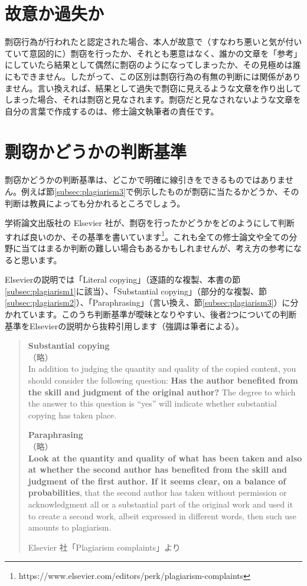 \section{故意か過失か}
剽窃行為が行われたと認定された場合、本人が故意で（すなわち悪いと気が付いていて意図的に）剽窃を行ったか、それとも悪意はなく、誰かの文章を「参考」にしていたら結果として偶然に剽窃のようになってしまったか、その見極めは誰にもできません。したがって、この区別は剽窃行為の有無の判断には関係がありません。言い換えれば、結果として過失で剽窃に見えるような文章を作り出してしまった場合、それは剽窃と見なされます。剽窃だと見なされないような文章を自分の言葉で作成するのは、修士論文執筆者の責任です。

\section{剽窃かどうかの判断基準}

剽窃かどうかの判断基準は、どこかで明確に線引きをできるものではありません。例えば節\ref{subsec:plagiarism3}で例示したものが剽窃に当たるかどうか、その判断は教員によっても分かれるところでしょう。

学術論文出版社の Elsevier 社が、剽窃を行ったかどうかをどのようにして判断すれば良いのか、その基準を書いています\footnote{https://www.elsevier.com/editors/perk/plagiarism-complaints}。これも全ての修士論文や全ての分野に当てはまるか判断の難しい場合もあるかもしれませんが、考え方の参考になると思います。

Elsevierの説明では「Literal copying」（逐語的な複製、本書の節\ref{subsec:plagiarism1}に該当）、「Substantial copying」（部分的な複製、節\ref{subsec:plagiarism2}）、「Paraphrasing」（言い換え、節\ref{subsec:plagiarism3}）に分かれています。このうち判断基準が曖昧となりやすい、後者2つについての判断基準をElsevierの説明から抜粋引用します（強調は筆者による）。

\begin{quote}
\textbf{Substantial copying}\\
（略）\\
In addition to judging the quantity and quality of the copied content, you should consider the following question: \textbf{Has the author benefited from the skill and judgment of the original author?} The degree to which the answer to this question is “yes” will indicate whether substantial copying has taken place.

\textbf{Paraphrasing}\\
（略）\\
\textbf{Look at the quantity and quality of what has been taken and also at whether the second author has benefited from the skill and judgment of the first author. If it seems clear, on a balance of probabilities}, that the second author has taken without permission or acknowledgment all or a substantial part of the original work and used it to create a second work, albeit expressed in different words, then such use amounts to plagiarism.

\begin{flushright}
  Elsevier 社「Plagiarism complaints」より
\end{flushright}
\end{quote}

